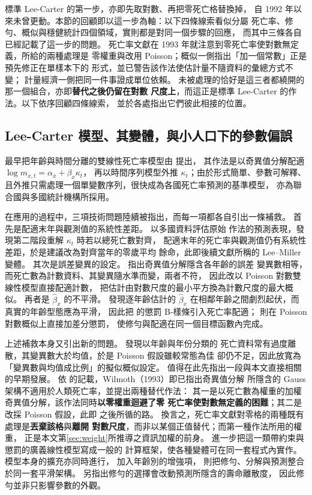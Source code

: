 \documentclass[UTF8, fontset=macnew, a4paper, 12pt]{ctexart}
\begin{document}
標準 Lee-Carter 的第一步，亦即先取對數、再把零死亡格替換掉，
自 1992 年以來未曾更動。本節的回顧即以這一步為軸：以下四條線索看似分屬
死亡率、修勻、概似與穩健統計四個領域，實則都是對同一個步驟的回應，
而其中三條各自已經記載了這一步的問題。
死亡率文獻在 1993 年就注意到零死亡率使對數無定義，所給的兩種處理是
零權重與改用 Poisson；概似一側指出「加一個常數」正是預先修正在單樣本下的
形式，並已警告該作法使估計量不隨資料的彙總方式不變；
計量經濟一側把同一件事證成單位依賴。
未被處理的恰好是這三者都繞開的那一個組合，亦即\textbf{替代之後仍留在對數
尺度上}，而這正是標準 Lee-Carter 的作法。以下依序回顧四條線索，
並於各處指出它們彼此相接的位置。

\subsection{Lee-Carter 模型、其變體，與小人口下的參數偏誤}\label{subsec:lc}

最早把年齡與時間分離的雙線性死亡率模型由 \citet{lee1992} 提出，
其作法是以奇異值分解配適 $\log m_{x,t}=\alpha_x+\beta_x\kappa_t$，
再以時間序列模型外推 $\kappa_t$；由於形式簡單、參數可解釋、
且外推只需處理一個單變數序列，很快成為各國死亡率預測的基準模型，
亦為聯合國與多國統計機構所採用。

在應用的過程中，三項技術問題陸續被指出，而每一項都各自引出一條補救。
首先是配適末年與觀測值的系統性差距。\citet{leemiller2001} 以多國資料評估原始
作法的預測表現，發現第二階段重解 $\kappa_t$ 時若以總死亡數對齊，
配適末年的死亡率與觀測值仍有系統性差距，於是建議改為對齊當年的零歲平均
餘命，此即後續文獻所稱的 Lee--Miller 變體。
其次是誤差變異的設定。\citet{brouhns2002} 指出奇異值分解隱含各年齡的誤差
變異數相等，而死亡數為計數資料、其變異隨水準而變，兩者不符，
因此改以 Poisson 對數雙線性模型直接配適計數，
把估計由對數尺度的最小平方換為計數尺度的最大概似。
再者是 $\hat\beta_x$ 的不平滑。\citet{currie2004} 發現逐年齡估計的
$\hat\beta_x$ 在相鄰年齡之間劇烈起伏，而真實的年齡型態應為平滑，
因此把 \citet{eilers1996} 的懲罰 B-樣條引入死亡率配適；
\citet{delwarde2007} 則在 Poisson 對數概似上直接加差分懲罰，
使修勻與配適在同一個目標函數內完成。

上述補救本身又引出新的問題。\citet{djeundje2010} 發現以年齡與年份分類的
死亡資料常有過度離散，其變異數大於均值，於是 Poisson 假設雖較常態為佳
卻仍不足，因此放寬為「變異數與均值成比例」的擬似概似設定。
值得在此先指出一段與本文直接相關的早期發展。
依 \citet[\S4.3]{basellini2023} 的記載，Wilmoth（1993）即已指出奇異值分解
所隱含的 Gauss 架構不適用於人類死亡率，並提出兩種替代作法：
其一是以死亡數為權重的加權奇異值分解，該作法同時\textbf{以零權重迴避了零
死亡率使對數無定義的困難}；其二是改採 Poisson 假設，此即
\citet{brouhns2002} 之後所循的路。
換言之，死亡率文獻對零格的兩種既有處理是\textbf{丟棄該格}與\textbf{離開
對數尺度}，而非以某個正值替代；而第一種作法所用的權重，
正是本文第\ref{sec:weight}所推導之資訊加權的前身。
\citet{currie2013} 進一步把這一類帶約束與懲罰的廣義線性模型寫成一般的
計算框架，使各種變體可在同一套程式內實作。
模型本身的擴充亦同時進行，\citet{renshaw2003} 加入年齡別的增強項，
\citet{camarda2021} 則把修勻、分解與預測整合於同一套平滑架構。
\citet{rabbi2021} 另指出修勻的選擇會改動預測所隱含的壽命離散度，
因此修勻並非只影響參數的外觀。
\end{document}
